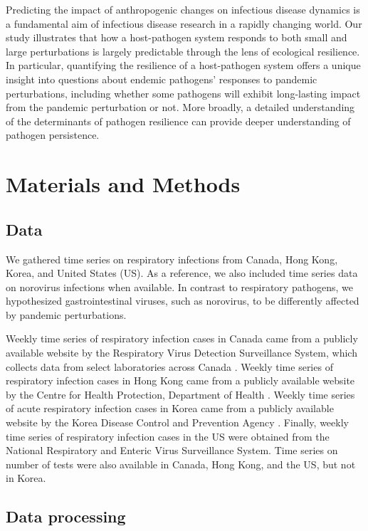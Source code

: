 \documentclass[12pt]{article}
\newcommand{\comment}{\showcomment}
\newcommand{\showcomment}[3]{\textcolor{#1}{\textbf{[#2: }\textsl{#3}\textbf{]}}}
\newcommand{\swp}[1]{\comment{magenta}{SWP}{#1}}
\begin{document}
Predicting the impact of anthropogenic changes on infectious disease dynamics is a fundamental aim of infectious disease research in a rapidly changing world.
Our study illustrates that how a host-pathogen system responds to both small and large perturbations is largely predictable through the lens of ecological resilience.
In particular, quantifying the resilience of a host-pathogen system offers a unique insight into questions about endemic pathogens' responses to pandemic perturbations, including whether some pathogens will exhibit long-lasting impact from the pandemic perturbation or not.
More broadly, a detailed understanding of the determinants of pathogen resilience can provide deeper understanding of pathogen persistence.

\section*{Materials and Methods}

\subsection*{Data}

We gathered time series on respiratory infections from Canada, Hong Kong, Korea, and United States (US).
As a reference, we also included time series data on norovirus infections when available.
In contrast to respiratory pathogens, we hypothesized gastrointestinal viruses, such as norovirus, to be differently affected by pandemic perturbations.

Weekly time series of respiratory infection cases in Canada came from a publicly available website by the Respiratory Virus Detection Surveillance System, which collects data from select laboratories across Canada \citep{phac}.
Weekly time series of respiratory infection cases in Hong Kong came from a publicly available website by the Centre for Health Protection, Department of Health \citep{hkdata,hkdata2}.
Weekly time series of acute respiratory infection cases in Korea came from a publicly available website by the Korea Disease Control and Prevention Agency \citep{kordata}.
Finally, weekly time series of respiratory infection cases in the US were obtained from the National Respiratory and Enteric Virus Surveillance System.
Time series on number of tests were also available in Canada, Hong Kong, and the US, but not in Korea.

\subsection*{Data processing}
\end{document}
